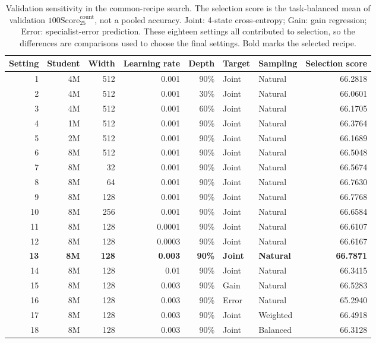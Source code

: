 \begin{table}[H]
\centering
\caption{Validation sensitivity in the common-recipe search. The selection score is the task-balanced mean of validation $100\mathrm{Score}_{25}^{\mathrm{count}}$, not a pooled accuracy. Joint: 4-state cross-entropy; Gain: gain regression; Error: specialist-error prediction. These eighteen settings all contributed to selection, so the differences are comparisons used to choose the final settings. Bold marks the selected recipe.}
\label{tab:sensitivity}
\small
\setlength{\tabcolsep}{5pt}
\begin{tabular}{@{}rrrrrllr@{}}
\toprule
Setting & Student & Width & Learning rate & Depth & Target & Sampling & Selection score \\
\midrule
1 & 4M & 512 & 0.001 & 90\% & Joint & Natural & 66.2818 \\
2 & 4M & 512 & 0.001 & 30\% & Joint & Natural & 66.0601 \\
3 & 4M & 512 & 0.001 & 60\% & Joint & Natural & 66.1705 \\
4 & 1M & 512 & 0.001 & 90\% & Joint & Natural & 66.3764 \\
5 & 2M & 512 & 0.001 & 90\% & Joint & Natural & 66.1689 \\
6 & 8M & 512 & 0.001 & 90\% & Joint & Natural & 66.5048 \\
7 & 8M & 32 & 0.001 & 90\% & Joint & Natural & 66.5674 \\
8 & 8M & 64 & 0.001 & 90\% & Joint & Natural & 66.7630 \\
9 & 8M & 128 & 0.001 & 90\% & Joint & Natural & 66.7768 \\
10 & 8M & 256 & 0.001 & 90\% & Joint & Natural & 66.6584 \\
11 & 8M & 128 & 0.0001 & 90\% & Joint & Natural & 66.6107 \\
12 & 8M & 128 & 0.0003 & 90\% & Joint & Natural & 66.6167 \\
\textbf{13} & \textbf{8M} & \textbf{128} & \textbf{0.003} & \textbf{90\%} & \textbf{Joint} & \textbf{Natural} & \textbf{66.7871} \\
14 & 8M & 128 & 0.01 & 90\% & Joint & Natural & 66.3415 \\
15 & 8M & 128 & 0.003 & 90\% & Gain & Natural & 66.5283 \\
16 & 8M & 128 & 0.003 & 90\% & Error & Natural & 65.2940 \\
17 & 8M & 128 & 0.003 & 90\% & Joint & Weighted & 66.4918 \\
18 & 8M & 128 & 0.003 & 90\% & Joint & Balanced & 66.3128 \\
\bottomrule
\end{tabular}
\end{table}
